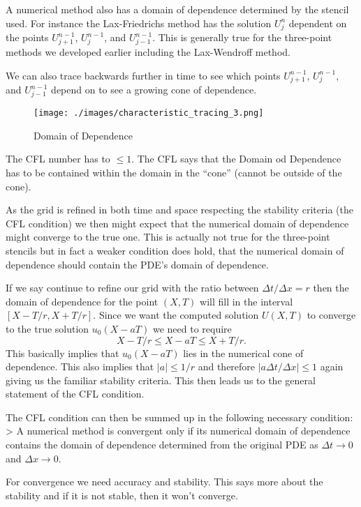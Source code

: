 \documentclass[11pt]{article}
\makeatletter
\def\maxwidth{\ifdim\Gin@nat@width>\linewidth\linewidth
    \else\Gin@nat@width\fi}
\let\Oldincludegraphics\includegraphics
\renewcommand{\includegraphics}[1]{\Oldincludegraphics[width=.8\maxwidth]{#1}}
\makeatother
\begin{document}
A numerical method also has a domain of dependence determined by the
stencil used. For instance the Lax-Friedrichs method has the solution
\(U^n_j\) dependent on the points \(U^{n-1}_{j+1}\), \(U^{n-1}_{j}\),
and \(U^{n-1}_{j-1}\). This is generally true for the three-point
methods we developed earlier including the Lax-Wendroff method.

    We can also trace backwards further in time to see which points
\(U^{n-1}_{j+1}\), \(U^{n-1}_{j}\), and \(U^{n-1}_{j-1}\) depend on to
see a growing cone of dependence.

\begin{figure}
\centering
\texttt{[image: ./images/characteristic\_tracing\_3.png]}
\caption{Domain of Dependence}
\end{figure}

 The CFL number has to \(\leq 1\). The CFL says that the Domain od
Dependence has to be contained within the domain in the ``cone'' (cannot
be outside of the cone).

    As the grid is refined in both time and space respecting the stability
criteria (the CFL condition) we then might expect that the numerical
domain of dependence might converge to the true one. This is actually
not true for the three-point stencils but in fact a weaker condition
does hold, that the numerical domain of dependence should contain the
PDE's domain of dependence.

    If we say continue to refine our grid with the ratio between
\(\Delta t / \Delta x = r\) then the domain of dependence for the point
\((X,T)\) will fill in the interval \([X - T/ r, X+ T/r]\). Since we
want the computed solution \(U(X,T)\) to converge to the true solution
\(u_0(X - a T)\) we need to require \[
    X - T/r \leq X - a T \leq X + T /r.
\] This basically implies that \(u_0(X - aT)\) lies in the numerical
cone of dependence. This also implies that \(|a| \leq 1 /r\) and
therefore \(|a \Delta t / \Delta x| \leq 1\) again giving us the
familiar stability criteria. This then leads us to the general statement
of the CFL condition.

    The CFL condition can then be summed up in the following necessary
condition: \textgreater{} A numerical method is convergent only if its
numerical domain of dependence contains the domain of dependence
determined from the original PDE as \(\Delta t \rightarrow 0\) and
\(\Delta x \rightarrow 0\).

 For convergence we need accuracy and stability. This says more about
the stability and if it is not stable, then it won't converge.
\end{document}
